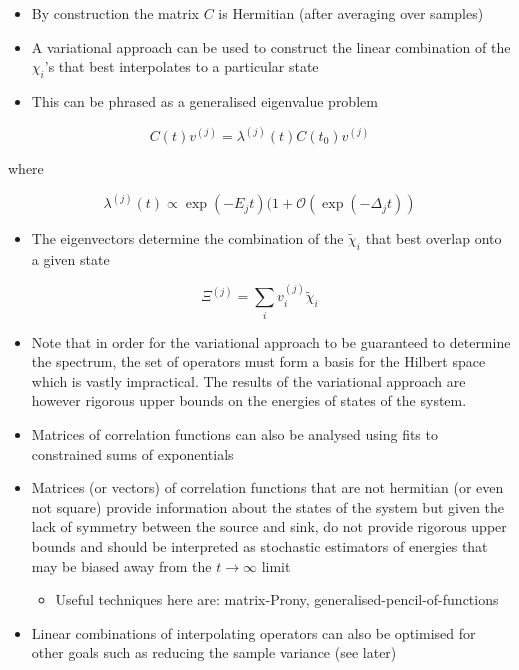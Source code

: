 \begin{itemize}
    \item By construction the matrix $C$ is Hermitian (after averaging over samples)
    \item A variational approach can be used to construct the linear combination of the $\chi_i$'s that best interpolates to a particular state
    \item This can be phrased as a generalised eigenvalue problem
\end{itemize}

\begin{equation}
C(t) v^{(j)}=\lambda^{(j)}(t) C\left(t_{0}\right) v^{(j)}
\end{equation}

where

\begin{equation}
\lambda^{(j)}(t) \propto \exp \left(-E_{j} t\right)(1+\mathcal{O}(\exp (-\Delta_j t))
\end{equation}

\begin{itemize}
    \item The eigenvectors determine the combination of the $\tilde{\chi}_i$ that best overlap onto a given state
\end{itemize}
\begin{equation}
    \Xi^{(j)} = \sum_i v_i^{(j)}\tilde{\chi}_i
\end{equation}
\begin{itemize}
    \item Note that in order for the variational approach to be guaranteed to determine the spectrum, the set of operators must form a basis for the Hilbert space which is vastly impractical. The results of the variational approach are however rigorous upper bounds on the energies of states of the system.
    \item Matrices of correlation functions can also be analysed using fits to constrained sums of exponentials
    \item Matrices (or vectors) of correlation functions that are not hermitian (or even not square) provide information about the states of the system but given the lack of symmetry between the source and sink, do not provide rigorous upper bounds and should be interpreted as stochastic estimators of energies that may be biased away from the $t \rightarrow \infty$ limit
    \begin{itemize}
        \item Useful techniques here are: matrix-Prony, generalised-pencil-of-functions
    \end{itemize}
    \item Linear combinations of interpolating operators can also be optimised for other goals such as reducing the sample variance (see later)
\end{itemize}

